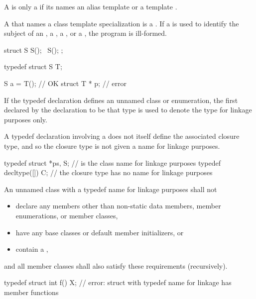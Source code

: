 \pnum
{}%
A  is only a 
if its  names
an alias template or a template .
\begin{note}
A  that names a class template specialization
is a .
If a  is used to identify the subject of an
, a , a , or a , the program is ill-formed.
\end{note}
\begin{example}
\begin{codeblock}
struct S {
  S();
  ~S();
};

typedef struct S T;

S a = T();                      // OK
struct T * p;                   // error
\end{codeblock}
\end{example}

\pnum
{}%
%
%
If the typedef declaration defines an unnamed class or enumeration, the first
 declared by the declaration to be that type
is used to denote the type for linkage purposes only.
\begin{note}
A typedef declaration involving a 
does not itself define the associated closure type,
and so the closure type is not given a name for linkage purposes.
\end{note}
\begin{example}
\begin{codeblock}
typedef struct { } *ps, S;      //  is the class name for linkage purposes
typedef decltype([]{}) C;       // the closure type has no name for linkage purposes
\end{codeblock}
\end{example}

\pnum
An unnamed class with a typedef name for linkage purposes shall not
\begin{itemize}
\item
  declare any members
  other than non-static data members, member enumerations, or member classes,
\item
  have any base classes or default member initializers, or
\item
  contain a ,
\end{itemize}
and all member classes shall also satisfy these requirements (recursively).
\begin{example}
\begin{codeblock}
typedef struct {
  int f() {}
} X;                            // error: struct with typedef name for linkage has member functions
\end{codeblock}
\end{example}

